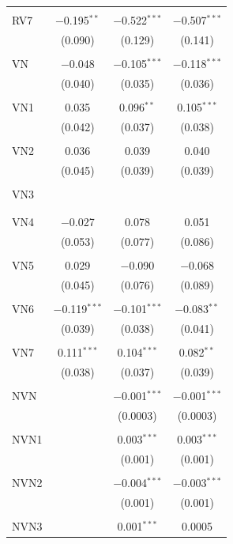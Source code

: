 \begin{table}[!htbp]
\begin{tabular}{@{\extracolsep{5pt}}lccc}
  & & & \\ 
 RV7 & $-$0.195$^{**}$ & $-$0.522$^{***}$ & $-$0.507$^{***}$ \\ 
  & (0.090) & (0.129) & (0.141) \\ 
  & & & \\ 
 VN & $-$0.048 & $-$0.105$^{***}$ & $-$0.118$^{***}$ \\ 
  & (0.040) & (0.035) & (0.036) \\ 
  & & & \\ 
 VN1 & 0.035 & 0.096$^{**}$ & 0.105$^{***}$ \\ 
  & (0.042) & (0.037) & (0.038) \\ 
  & & & \\ 
 VN2 & 0.036 & 0.039 & 0.040 \\ 
  & (0.045) & (0.039) & (0.039) \\ 
  & & & \\ 
 VN3 &  &  &  \\ 
  &  &  &  \\ 
  & & & \\ 
 VN4 & $-$0.027 & 0.078 & 0.051 \\ 
  & (0.053) & (0.077) & (0.086) \\ 
  & & & \\ 
 VN5 & 0.029 & $-$0.090 & $-$0.068 \\ 
  & (0.045) & (0.076) & (0.089) \\ 
  & & & \\ 
 VN6 & $-$0.119$^{***}$ & $-$0.101$^{***}$ & $-$0.083$^{**}$ \\ 
  & (0.039) & (0.038) & (0.041) \\ 
  & & & \\ 
 VN7 & 0.111$^{***}$ & 0.104$^{***}$ & 0.082$^{**}$ \\ 
  & (0.038) & (0.037) & (0.039) \\ 
  & & & \\ 
 NVN &  & $-$0.001$^{***}$ & $-$0.001$^{***}$ \\ 
  &  & (0.0003) & (0.0003) \\ 
  & & & \\ 
 NVN1 &  & 0.003$^{***}$ & 0.003$^{***}$ \\ 
  &  & (0.001) & (0.001) \\ 
  & & & \\ 
 NVN2 &  & $-$0.004$^{***}$ & $-$0.003$^{***}$ \\ 
  &  & (0.001) & (0.001) \\ 
  & & & \\ 
 NVN3 &  & 0.001$^{***}$ & 0.0005 \\ 

\end{tabular}
\end{table}
